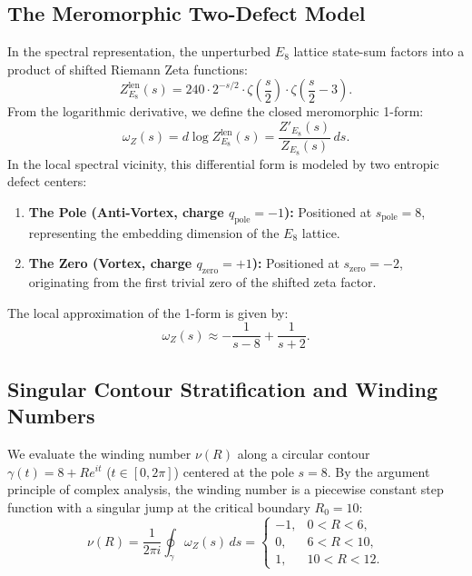 \documentclass[11pt,a4paper]{article}
\theoremstyle{definition}
\begin{document}
	\subsection{The Meromorphic Two-Defect Model}
	In the spectral representation, the unperturbed $E_8$ lattice state-sum factors into a product of shifted Riemann Zeta functions:
	\begin{equation}
		Z^{\mathrm{len}}_{E_8}(s) = 240 \cdot 2^{-s/2} \cdot \zeta\left(\frac{s}{2}\right) \cdot \zeta\left(\frac{s}{2} - 3\right).
	\end{equation}
	From the logarithmic derivative, we define the closed meromorphic 1-form:
	\begin{equation}
		\omega_Z(s) = d\log Z^{\mathrm{len}}_{E_8}(s) = \frac{Z'_{E_8}(s)}{Z_{E_8}(s)} \, ds.
	\end{equation}
	In the local spectral vicinity, this differential form is modeled by two entropic defect centers:
	\begin{enumerate}
		\item \textbf{The Pole (Anti-Vortex, charge $q_{\mathrm{pole}} = -1$):} Positioned at $s_{\mathrm{pole}} = 8$, representing the embedding dimension of the $E_8$ lattice.
		\item \textbf{The Zero (Vortex, charge $q_{\mathrm{zero}} = +1$):} Positioned at $s_{\mathrm{zero}} = -2$, originating from the first trivial zero of the shifted zeta factor.
	\end{enumerate}
	The local approximation of the 1-form is given by:
	\begin{equation}
		\omega_Z(s) \approx -\frac{1}{s-8} + \frac{1}{s+2}.
	\end{equation}
	
	\subsection{Singular Contour Stratification and Winding Numbers}
	We evaluate the winding number $\nu(R)$ along a circular contour $\gamma(t) = 8 + R e^{i t}$ ($t \in [0, 2\pi]$) centered at the pole $s = 8$. By the argument principle of complex analysis, the winding number is a piecewise constant step function with a singular jump at the critical boundary $R_0 = 10$:
	\begin{equation}
		\nu(R) = \frac{1}{2\pi i} \oint_{\gamma} \omega_Z(s) \, ds = 
		\begin{cases} 
			-1, & 0 < R < 6, \\
			0, & 6 < R < 10, \\
			1, & 10 < R < 12.
		\end{cases}
	\end{equation}
	
\end{document}
